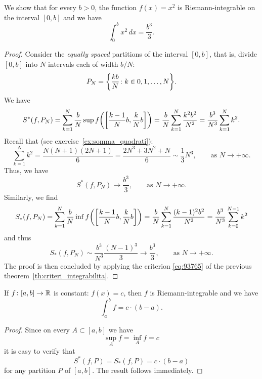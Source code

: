 \begin{example}%
\label{ex:integrale_quadrato}%
We show that for every $b>0$, the function $f(x)=x^2$ is Riemann-integrable on
the interval $[0,b]$ and we have
\[
 \int_0^b x^2\, dx = \frac{b^3}{3}.
\]
\end{example}
\begin{proof}
Consider the \emph{equally spaced} partitions of the interval $[0,b]$, that is,
divide $[0,b]$ into $N$ intervals each of width $b/N$:
\[
P_N = {\left\{ \frac{kb}{N}\colon k \in 0, 1, \dots, N \right\}}.
\]
We have
\[
  S^*(f,P_N) 
      = \sum_{k=1}^N \frac b N \sup f{\left( {\left[ \frac{k-1}{N} b,\frac k N
   b \right]} \right)}
   = \frac{b}{N} \sum_{k=1}^N \frac{k^2b^2}{N^2}
   = \frac{b^3}{N^3} \sum_{k=1}^N k^2.
\]
Recall that (see exercise~\ref{ex:somma_quadrati}):
\[
  \sum_{k=1}^N k^2 = \frac{N(N+1)(2N+1)}{6} = \frac{2N^3+3N^2+N}{6}
  \sim \frac 1 3 N^3,\qquad \text{as $N\to +\infty$}.
\]
Thus, we have
\[
  S^*(f,P_N) \to \frac {b^3} 3, \qquad \text{as $N\to +\infty$}.
\]
Similarly, we find
\[
  S_*(f,P_N) 
    = \sum_{k=1}^N \frac{b}{N}\inf f{\left( {\left[ \frac{k-1} N b,\frac k N
  b \right]} \right)}
  = \frac{b}{N}\sum_{k=1}^N \frac{(k-1)^2b^2}{N^2}
  = \frac{b^3}{N^3} \sum_{k=0}^{N-1} k^2
\]
and thus 
\[
    S_*(f,P_N) \sim \frac {b^3} {N^3} \frac {(N-1)^3} 3 \to \frac {b^3} 3,
  \qquad \text{as $N\to +\infty$}.
\]
The proof is then concluded by applying
the criterion \eqref{eq:93765} of the previous
theorem~\ref{th:criteri_integrabilita}.
\end{proof}

\begin{theorem}
\label{th:integrale_costante}
If $f\colon[a,b]\to {\mathbb R}$ is constant: $f(x) = c$, then
$f$ is Riemann-integrable and we have
\[
  \int_a^b f = c\cdot (b-a).
\]
\end{theorem}
%
\begin{proof}
Since on every $A\subset [a,b]$ we have
\[
  \sup_A f = \inf_A f = c
\]
it is easy to verify that
\[
  S^*(f,P) = S_*(f,P) = c\cdot (b-a)
\]
for any partition $P$ of $[a,b]$. The result follows immediately.
\end{proof}

